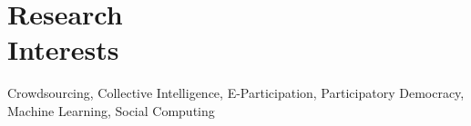 
\section{Research\\Interests}
\par
Crowdsourcing, Collective Intelligence, E-Participation, Participatory Democracy, Machine Learning, Social Computing